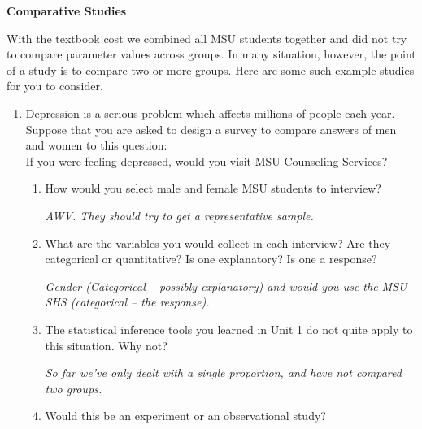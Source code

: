 \def\theTopic{Reading 10}

\begin{center}
  {\large\bf Comparative Studies}
\end{center}

  With the textbook cost we combined all MSU students together and did
  not try to compare parameter values across groups.  In many
  situation, however, the point of a study is to compare two or more
  groups. Here are some such example studies for you to consider. 

\begin{enumerate}
  \item  Depression is a serious problem which affects millions of
    people each year. Suppose that you are asked to 
    design a survey to compare answers of men and women to this question:\\
    {\sf If you were feeling depressed, would you visit MSU Counseling Services?}
    \begin{enumerate}
    \item How would you select male and female MSU students to
      interview?
\begin{students}
        \vfill
\end{students}
\begin{key}
 {\it AWV. They should try to get a representative sample.}
\end{key}
\item What are the variables you would collect in each interview?
      Are they categorical or quantitative? Is one explanatory? Is one a response?
\begin{students}
        \vfill
\end{students}
\begin{key}
 {\it Gender (Categorical -- possibly explanatory) and would you use
   the MSU SHS (categorical -- the response).}
\end{key}
    \item The statistical inference tools you learned in Unit 1 do not
      quite apply to this situation.  Why not? 
\begin{students}
        \vfill
\end{students}
\begin{key}
 {\it So far we've only dealt with a single proportion, and have not
   compared two groups. }
\end{key}
    \item Would this be an experiment or an observational study?
\begin{students}

\end{students}
\end{enumerate}
\end{enumerate}
